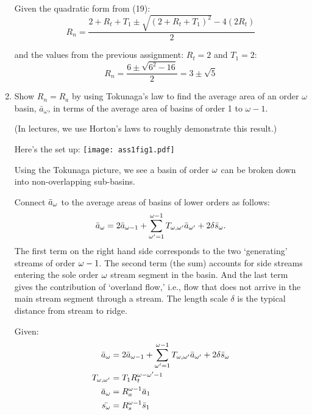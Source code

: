 \begin{enumerate}
Given the quadratic form from (19):\\
$$  
    R_n = \frac
    {2 + R_t + T_1 \pm \sqrt{(2+R_t+T_1)^2}-4(2R_t)}
    {2}
$$

and the values from the previous assignment: $R_t = 2$ and $T_1 = 2$:\\
$$
    R_n = \frac{6 \pm \sqrt{6^2-16}}{2} = 3 \pm \sqrt{5}
$$
    \solutionend

\item 

  Show $R_n = R_a$ by 
  using Tokunaga's law to find the average area of an
  order $\omega$ basin, $\bar{a}_\omega$, in terms
  of the average area of basins of order 1 to $\omega-1$.

  (In lectures, we use Horton's laws to roughly demonstrate
  this result.)


  Here's the set up:
  \texttt{[image: ass1fig1.pdf]}

  Using the Tokunaga picture, we see a basin of order $\omega$ 
  can be broken down into non-overlapping sub-basins.

  Connect $\bar{a}_\omega$ to the average areas of
  basins of lower orders as follows:
  $$
  \bar{a}_\omega
  = 
  2\bar{a}_{\omega-1}
  +
  \sum_{\omega'=1}^{\omega-1}
  T_{\omega,\omega'} 
  \bar{a}_{\omega'}
  +
  2\delta \bar{s}_\omega.
  $$
  The first term on the right hand side 
  corresponds to the two `generating' streams
  of order $\omega-1$.  The second term (the sum)
  accounts for side streams entering the
  sole order $\omega$ stream segment in the basin.
  And the last term gives the contribution of
  `overland flow,' i.e., flow that does not
  arrive in the main stream segment through
  a stream.  The length scale $\delta$ is
  the typical distance from stream to ridge.

  
   \solutionstart
   
   Given:
   \begin{align}
   \bar{a}_\omega
   &= 
   2\bar{a}_{\omega-1} +
   \sum_{\omega'=1}^{\omega-1}
   T_{\omega,\omega'} 
   \bar{a}_{\omega'}
   +
   2\delta \bar{s}_\omega\\
   T_{\omega,\omega'} &= T_1 R_{t}^{\omega-\omega'-1}\\
   \bar{a}_\omega &= R_{a}^{\omega-1} \bar{a}_1\\
   \bar{s_\omega} &= R_{s}^{\omega-1} \bar{s}_1\\
   \end{align}
   

\end{enumerate}
